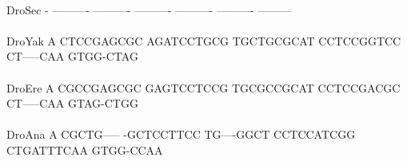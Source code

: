 \documentclass[11pt,twoside,reqno,a4paper]{article}
\begin{document}
{\hspace*{7\charwidth}\hspace*{1\charwidth}\hspace*{1\charwidth}\hspace*{1\charwidth}\hspace*{1\charwidth}\hspace*{1\charwidth}\hspace*{1\charwidth}\\
DroSec	-	----------	----------	----------	----------	----------	---------\\
\hspace*{7\charwidth}\hspace*{1\charwidth}\hspace*{1\charwidth}\hspace*{1\charwidth}\hspace*{1\charwidth}\hspace*{1\charwidth}\hspace*{1\charwidth}\\
DroYak	A	CTCCGAGCGC	AGATCCTGCG	TGCTGCGCAT	CCTCCGGTCC	CT-----CAA	GTGG-CTAG\\
\hspace*{7\charwidth}\hspace*{1\charwidth}\hspace*{1\charwidth}\hspace*{1\charwidth}\hspace*{1\charwidth}\hspace*{1\charwidth}\hspace*{1\charwidth}\\
DroEre	A	CGCCGAGCGC	GAGTCCTCCG	TGCGCCGCAT	CCTCCGACGC	CT-----CAA	GTAG-CTGG\\
\hspace*{7\charwidth}\hspace*{1\charwidth}\hspace*{1\charwidth}\hspace*{1\charwidth}\hspace*{1\charwidth}\hspace*{1\charwidth}\hspace*{1\charwidth}\\
DroAna	A	CGCTG-----	-GCTCCTTCC	TG----GGCT	CCTCCATCGG	CTGATTTCAA	GTGG-CCAA\\
\hspace*{7\charwidth}\hspace*{1\charwidth}\hspace*{1\charwidth}\hspace*{1\charwidth}\hspace*{1\charwidth}\hspace*{1\charwidth}\hspace*{1\charwidth}\\
}
\end{document}
